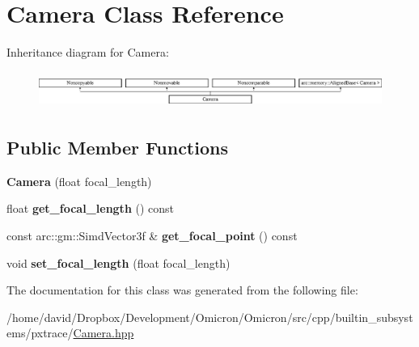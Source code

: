 \hypertarget{class_camera}{}\section{Camera Class Reference}
\label{class_camera}
Inheritance diagram for Camera\+:\begin{figure}[H]
\begin{center}
\leavevmode
\includegraphics[height=1.196581cm]{class_camera}
\end{center}
\end{figure}
\subsection*{Public Member Functions}
\begin{DoxyCompactItemize}
\item 
{\bfseries Camera} (float focal\+\_\+length)\hypertarget{class_camera_ac04731f6e389bd64b66d6a73a3cab02c}{}\label{class_camera_ac04731f6e389bd64b66d6a73a3cab02c}

\item 
float {\bfseries get\+\_\+focal\+\_\+length} () const \hypertarget{class_camera_a3656ec90c9a6ec3d4686e825445780cb}{}\label{class_camera_a3656ec90c9a6ec3d4686e825445780cb}

\item 
const arc\+::gm\+::\+Simd\+Vector3f \& {\bfseries get\+\_\+focal\+\_\+point} () const \hypertarget{class_camera_ac578aecaf759fc92f85f8bd4c06cd860}{}\label{class_camera_ac578aecaf759fc92f85f8bd4c06cd860}

\item 
void {\bfseries set\+\_\+focal\+\_\+length} (float focal\+\_\+length)\hypertarget{class_camera_af040e8de4fcaff522ddeade8342eaf51}{}\label{class_camera_af040e8de4fcaff522ddeade8342eaf51}

\end{DoxyCompactItemize}


The documentation for this class was generated from the following file\+:\begin{DoxyCompactItemize}
\item 
/home/david/\+Dropbox/\+Development/\+Omicron/\+Omicron/src/cpp/builtin\+\_\+subsystems/pxtrace/\hyperlink{_camera_8hpp}{Camera.\+hpp}\end{DoxyCompactItemize}
